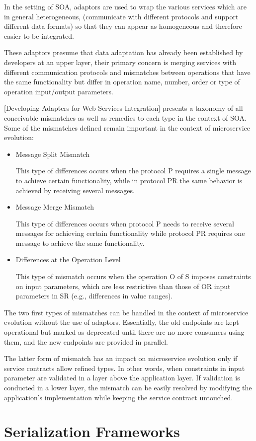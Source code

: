 In the setting of SOA, adaptors are used to wrap the various services which are in general heterogeneous,
(communicate with different protocols and support different data formats) so that they can appear as homogeneous and therefore easier to be integrated.

These adaptors presume that data adaptation has already been established by developers at an upper layer,
their primary concern is merging services with different communication protocols and mismatches between operations that have the
same functionality but differ in operation name, number, order or type of operation input/output parameters.

[Developing Adapters for Web Services Integration] presents a taxonomy of all conceivable mismatches as well as remedies to each type in the context of SOA.
Some of the mismatches defined remain important in the context of microservice evolution:
\begin{itemize}
    \item Message Split Mismatch

    This type of differences occurs when the protocol P requires a single message to achieve certain functionality, while in protocol PR the same behavior is achieved by receiving several messages.
    \item Message Merge Mismatch

    This type of differences occurs when protocol P needs to receive several messages for achieving certain
    functionality while protocol PR requires one message to achieve the same functionality.
    \item Differences at the Operation Level

    This type of mismatch occurs when the operation O of S imposes constraints on input parameters,
    which are less restrictive than those of OR input parameters in SR (e.g., differences in value ranges).
\end{itemize}

The two first types of mismatches can be handled in the context of microservice evolution without the use of adaptors.
Essentially, the old endpoints are kept operational but marked as deprecated until there are no more consumers using them, and the new endpoints are provided in parallel.

The latter form of mismatch has an impact on microservice evolution only if service contracts allow refined types.
In other words, when constraints in input parameter are validated in a layer above the application layer.
If validation is conducted in a lower layer, the mismatch can be easily resolved by modifying the application's implementation while keeping the service contract untouched.

\section{} %
\label{sec:serialization_frameworks}

\section{Serialization Frameworks} %
\label{sec:serialization_frameworks}